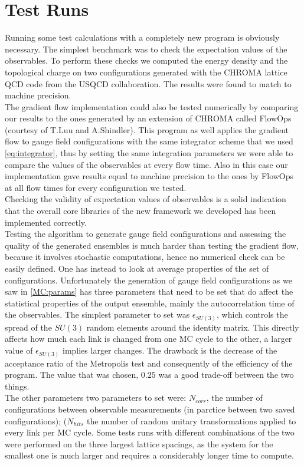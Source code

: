 \section{Test Runs}
\label{sec:testautocorr}
Running some test calculations with a completely new program is obviously necessary. The simplest benchmark was to check the expectation values of the observables. To perform these checks we computed the energy density and the topological charge on two configurations generated with the CHROMA lattice QCD code from the USQCD collaboration\cite{edwards_chroma_2005}.  The results were found to match to machine precision. \\
The gradient flow implementation could also be tested numerically by comparing our results to the ones generated by an extension of CHROMA called FlowOps (courtesy of T.Luu and A.Shindler)\cite{shindler_nucleon_2015}. This program as well applies the gradient flow to gauge field configurations with the same integrator scheme that we used \cref{eq:integrator}, thus by setting the same integration parameters we were able to compare the values of the observables at every flow time. Also in this case our implementation gave results equal to machine precision to the ones by FlowOps at all flow times for every configuration we tested.\\
Checking the validity of expectation values of observables is a solid indication that the overall core libraries of the new framework we developed has been implemented correctly. \\
Testing the algorithm to generate gauge field configurations and assessing the quality of the generated ensembles is much harder than testing the gradient flow, because it involves stochastic computations, hence no numerical check can be easily defined. One has instead to look at average properties of the set of configurations. Unfortunately the generation of gauge field configurations as we saw in \cref{MC:params} has three parameters that need to be set that do affect the statistical properties of the output ensemble, mainly the autocorrelation time of the observables. The simplest parameter to set was $\epsilon_{SU(3)}$, which controls the spread of the $SU(3)$ random elements around the identity matrix. This directly affects how much each link is changed from one MC cycle to the other, a larger value of $\epsilon_{SU(3)}$ implies larger changes. The drawback is the decrease of the acceptance ratio of the Metropolis test and consequently of the efficiency of the program. The value that was chosen, $0.25$ was a good trade-off between the two things.\\
The other parameters two parameters to set were: $N_{corr}$, the number of configurations between observable measurements (in parctice between two saved configurations); ($N_{hits}$ the number of random unitary transformations applied to every link per MC cycle. Some tests runs with different combinations of the two were performed on the three largest lattice spacings, as the system for the smallest one is much larger and requires a considerably longer time to compute.


